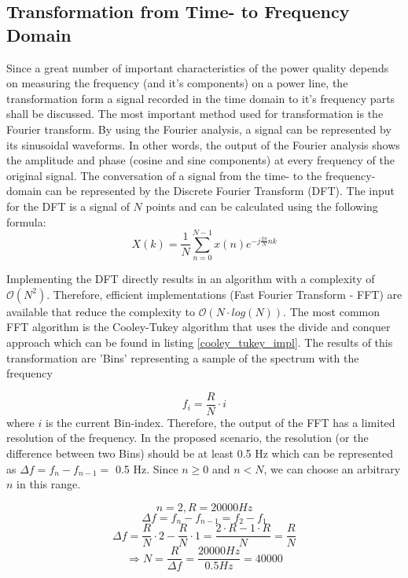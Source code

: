 \subsection{Transformation from Time- to Frequency Domain}

\label{fft}
Since a great number of important characteristics of the power quality depends on measuring the frequency (and it's components) on a power line, the transformation form a signal recorded in the time domain to it's frequency parts shall be discussed.
The most important method used for transformation is the Fourier transform. By using the Fourier analysis, a signal can be represented by its sinusoidal waveforms. In other words, the output of the Fourier analysis shows the amplitude and phase (cosine and sine components) at every frequency of the original signal. The conversation of a signal from the time- to the frequency-domain can be represented by the Discrete Fourier Transform (DFT). The input for the DFT is a signal of $N$ points and can be calculated using the following formula\cite{fourier}:
\[ X(k) = \frac{1}{N} \sum_{n=0}^{N-1} x(n) e^{-j \frac{2 \pi}{N} nk} \]


Implementing the DFT directly results in an algorithm with a complexity of $\mathcal O(N^2)$. Therefore, efficient implementations (Fast Fourier Transform - FFT) are available that reduce the complexity to $\mathcal O(N \cdot log(N))$. The most common FFT algorithm is the Cooley-Tukey algorithm that uses the divide and conquer approach which can be found in listing \ref{cooley_tukey_impl}\cite{cooley_tukey}. The results of this transformation are 'Bins' representing a sample of the spectrum with the frequency

\[f_i = \frac{R}{N} \cdot i \]
where $i$ is the current Bin-index. Therefore, the output of the FFT has a limited resolution of the frequency. In the proposed scenario, the resolution (or the difference between two Bins) should be at least 0.5 Hz which can be represented as $\Delta f = f_{n} - f_{n-1} = $ 0.5 Hz. Since $n \geq 0 $ and $n < N$, we can choose an arbitrary $n$ in this range.

\[ n = 2, R = 20000 Hz \]
\[ \Delta f = f_{n} - f_{n-1} = f_{2} - f_{1} \]
\[ \Delta f = \frac{R}{N} \cdot 2 - \frac{R}{N} \cdot 1 = \frac{2 \cdot R - 1 \cdot R}{N} = \frac{R}{N} \]
\[ \Rightarrow N = \frac{R}{\Delta f} = \frac{20000 Hz}{0.5 Hz} = 40000 \]

